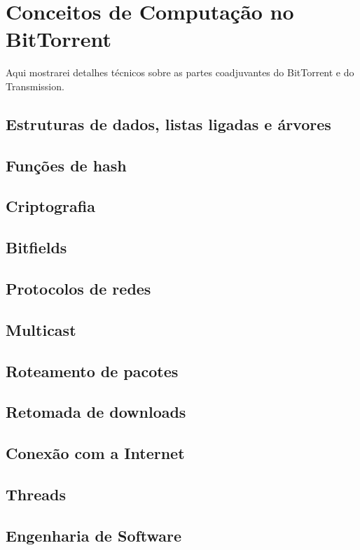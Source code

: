 
\chapter{Conceitos de Computação no BitTorrent}

Aqui mostrarei detalhes técnicos sobre as partes coadjuvantes do BitTorrent e do Transmission.


\section{Estruturas de dados, listas ligadas e árvores}
\section{Funções de hash} %
\section{Criptografia} %
\section{Bitfields}
\section{Protocolos de redes} %
\section{Multicast}
\section{Roteamento de pacotes} %
\section{Retomada de downloads}
\section{Conexão com a Internet}
\section{Threads}
\section{Engenharia de Software}

\afterpage{\clearpage}

